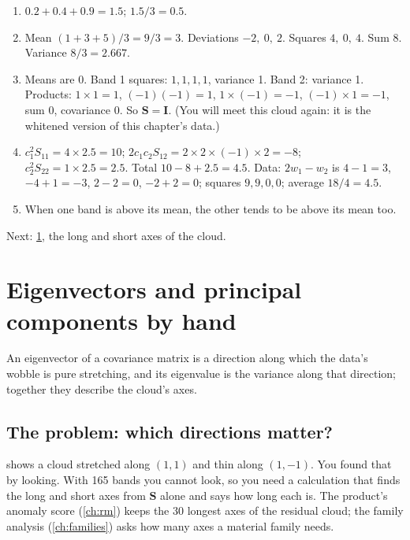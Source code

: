 \documentclass[11pt,a4paper,oneside,openany]{book}
\newcommand{\B}[1]{{\symbf{#1}}}
\newcommand{\B}[1]{{\bm{#1}}}
\newcommand{\mS}{\B{S}}
\newcommand{\mI}{\B{I}}
\newcommand{\nextchapter}[1]{\par\medskip\noindent\hfill\textsf{\small Next: #1}\par}
\begin{document}
\begin{answers}
\begin{enumerate}
\item $0.2+0.4+0.9=1.5$; $1.5/3=0.5$.
\item Mean $(1+3+5)/3=9/3=3$. Deviations $-2,\ 0,\ 2$. Squares $4,\ 0,\ 4$. Sum $8$. Variance $8/3=2.667$.
\item Means are 0. Band 1 squares: $1,1,1,1$, variance 1. Band 2: variance 1. Products: $1\times1=1$, $(-1)(-1)=1$,
  $1\times(-1)=-1$, $(-1)\times1=-1$, sum 0, covariance 0. So $\mS=\mI$. (You will meet this cloud again: it is the
  whitened version of this chapter's data.)
\item $c_1^2S_{11}=4\times2.5=10$; $2c_1c_2S_{12}=2\times2\times(-1)\times2=-8$; $c_2^2S_{22}=1\times2.5=2.5$. Total
  $10-8+2.5=4.5$. Data: $2w_1-w_2$ is $4-1=3$, $-4+1=-3$, $2-2=0$, $-2+2=0$; squares $9,9,0,0$; average $18/4=4.5$.
\item When one band is above its mean, the other tends to be above its mean too.
\end{enumerate}
\end{answers}

\nextchapter{\cref{ch:eigen}, the long and short axes of the cloud.}

\chapter{Eigenvectors and principal components by hand}
\label{ch:eigen}

\begin{onething}
An eigenvector of a covariance matrix is a direction along which the data's wobble is pure stretching, and its eigenvalue is
the variance along that direction; together they describe the cloud's axes.
\end{onething}

\section{The problem: which directions matter?}

 shows a cloud stretched along $(1,1)$ and thin along $(1,-1)$. You found that by looking. With 165 bands
you cannot look, so you need a calculation that finds the long and short axes from $\mS$ alone and says how long each is. The
product's anomaly score (\cref{ch:rm}) keeps the 30 longest axes of the residual cloud; the family analysis
(\cref{ch:families}) asks how many axes a material family needs.
\end{document}

